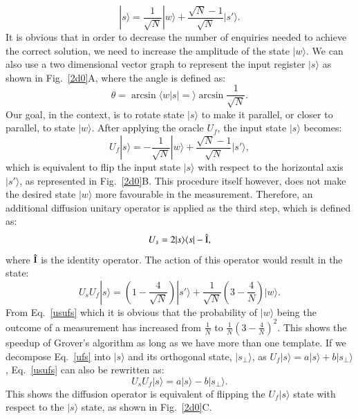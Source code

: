 \documentclass[aps,prd,nofootinbib,twocolumn,reprint,superscriptaddress,showpacs,showkeys,longbibliography]{revtex4-1}
\newcommand{\bra}[1]{\langle #1|}
\newcommand{\ket}[1]{|#1\rangle}
\newcommand{\braket}[2]{\langle #1|#2\rangle}
\begin{document}
\begin{equation}
    \label{so}
    \ket{s}=\frac{1}{\sqrt{N}}\ket{w}+\frac{\sqrt{N}-1}{\sqrt{N}}\ket{s'}.
\end{equation}
It is obvious that in order to decrease the number of enquiries needed to achieve the correct solution, we need to increase the amplitude of the state $\ket{w}$. We can also use a two dimensional vector graph to represent the input register $\ket{s}$ as shown in Fig.~\ref{2d0}A, where the angle is defined as:
\begin{equation}
\label{theta}
   \theta=\arcsin\braket{w|s}=\arcsin {\frac{1}{\sqrt{N}}}.
\end{equation}
Our goal, in the context, is to rotate state $\ket{s}$ to make it parallel, or closer to parallel, to state $\ket{w}$. After applying the oracle $U_f$, the input state $\ket{s}$ becomes:
\begin{equation}
    \label{ufs}
    U_f\ket{s}=-\frac{1}{\sqrt{N}}\ket{w}+\frac{\sqrt{N}-1}{\sqrt{N}}\ket{s'},
\end{equation}
which is equivalent to flip the input state $\ket{s}$ with respect to the horizontal axis $\ket{s'}$, as represented in Fig.~\ref{2d0}B. This procedure itself however, does not make the desired state $\ket{w}$ more favourable in the measurement. Therefore, an additional diffusion unitary operator is applied as the third step, which is defined as:
\begin{equation}
    \label{Us}
    U_s=2\ket{s}\bra{s}-\hat{\rm I},
\end{equation}
where $\hat{\rm I}$ is the identity operator. The action of this operator would result in the state:
\begin{equation}
    \label{usufs}
    U_sU_f\ket{s}=(1-\frac{4}{\sqrt{N}})\ket{s'}+\frac{1}{\sqrt{N}}(3-\frac{4}{N})\ket{w}.
\end{equation}
From Eq.~\ref{usufs} which it is obvious that the probability of $\ket{w}$ being the outcome of a measurement has increased from $\frac{1}{N}$ to $\frac{1}{N}(3-\frac{4}{N})^2$. This shows the speedup of Grover's algorithm as long as we have more than one template. If we decompose Eq.~\ref{ufs} into $\ket{s}$ and its orthogonal state, $\ket{s_\perp}$, as $U_f\ket{s}=a\ket{s}+b\ket{s_\perp}$, Eq.~\ref{usufs} can also be rewritten as:
\begin{equation}
    \label{usufsp}
    U_sU_f\ket{s}=a\ket{s}-b\ket{s_\perp}.
\end{equation}
This shows the diffusion operator is equivalent of flipping the $U_f\ket{s}$ state with respect to the $\ket{s}$ state, as shown in Fig.~\ref{2d0}C.
\end{document}
